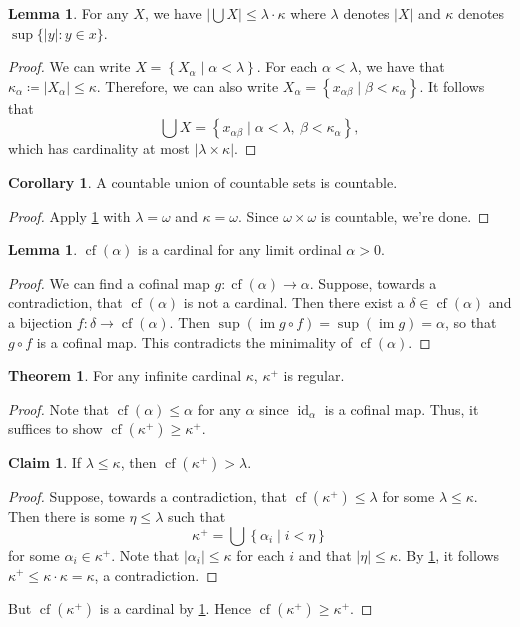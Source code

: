 \documentclass[10pt,letterpaper,cm]{nupset}
\theoremstyle{definition}
\theoremstyle{theorem}
\newtheorem{theorem}[definition]{Theorem}
\newtheorem{lemma}[definition]{Lemma}
\newtheorem{corollary}[definition]{Corollary}
\newtheorem*{claim}{Claim}
\theoremstyle{remark}
\newcommand{\1}{\mathbf{1}}
\newcommand{\0}{\vec 0}
\DeclareMathOperator{\id}{id}
\DeclareMathOperator{\im}{im}
\DeclareMathOperator{\cf}{cf}
\begin{document}
\begin{lemma}\label{card-prop}
For any $X$, we have $\left\lvert{\bigcup{X}}\right\rvert \leq \lambda \cdot \kappa$ where $\lambda$ denotes $\left\lvert{X}\right\rvert $ and $\kappa$ denotes $\sup\{\left\lvert{y}\right\rvert : y\in x\}$.
\end{lemma}
\begin{proof}
We can write $X=\left\{X_{\alpha} \mid \alpha <\lambda\right\}$. For each $\alpha <\lambda$, we have that $\kappa_{\alpha} \coloneqq \left\lvert{X_{\alpha}}\right\rvert \leq \kappa$. Therefore, we can also write $X_{\alpha} = \left\{x_{\alpha{\beta}} \mid \beta < \kappa_{\alpha}\right\}$. It follows that $$\bigcup{X} =\left\{ x_{\alpha{\beta}} \mid \alpha <\lambda, \ \beta < \kappa_{\alpha}\right\},   $$ which has cardinality at most $\left\lvert{\lambda \times \kappa}\right\rvert$.
\end{proof}

\begin{corollary}
A countable union of countable sets is countable.
\end{corollary}
\begin{proof}
Apply \cref{card-prop} with $\lambda =\omega$ and $\kappa = \omega$. Since $\omega \times \omega$ is countable, we're done.
\end{proof}

\begin{lemma}\label{PL'}
$\cf(\alpha)$ is a cardinal for any limit ordinal $\alpha >0$.
\end{lemma}
\begin{proof}
We can find a cofinal map $g: \cf(\alpha) \to \alpha$. Suppose, towards a contradiction, that $\cf(\alpha)$  is not a cardinal. Then there exist a $\delta \in \cf(\alpha)$  and a bijection $f: \delta \to \cf(\alpha)$. Then $\sup(\im{g\circ f}) = \sup(\im{g}) = \alpha $, so that $g \circ f$ is a cofinal map. This contradicts the minimality of $\cf(\alpha)$. 
\end{proof}

\begin{theorem}
For any infinite cardinal $\kappa$, $\kappa^+$ is regular. 
\end{theorem}
\begin{proof}
Note that $\cf(\alpha)\leq \alpha$ for any $\alpha$ since $\id_{\alpha}$ is a cofinal map. Thus, it suffices to show $\cf(\kappa^+) \geq \kappa^+$. 
\begin{claim}
If $\lambda \leq \kappa$, then $\cf(\kappa^+) > \lambda$. 
\end{claim}
\begin{proof}
Suppose, towards a contradiction, that $\cf(\kappa^+) \leq \lambda$ for some $\lambda \leq \kappa$. Then there is some $\eta \leq \lambda$ such that $$\kappa^+ = \bigcup{\left\{\alpha_i \mid i <\eta \right\}}$$ for some $\alpha_i \in \kappa^+$. Note that $\left\lvert{\alpha_i}\right\rvert \leq \kappa$ for each $i$ and that $\left\lvert{\eta}\right\rvert \leq \kappa$. By \cref{card-prop}, it follows $\kappa^+ \leq \kappa \cdot \kappa = \kappa$, a contradiction.  
\end{proof}But $\cf(\kappa^+)$ is a cardinal  by \cref{PL'}. Hence $\cf(\kappa^+) \geq \kappa^+$.
\end{proof}
\end{document}
